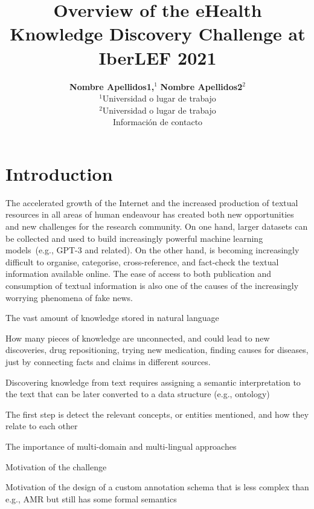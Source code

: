\documentclass[a4paper,11pt,twocolumn,twoside]{article}
\title{Overview of the eHealth Knowledge Discovery Challenge at IberLEF 2021}
\author {\textbf{Nombre Apellidos1,$^1$} \textbf{Nombre Apellidos2$^2$}\\
$^1$Universidad o lugar de trabajo\\
$^2$Universidad o lugar de trabajo\\
Información de contacto\\
}
\begin{document}


\label{firstpage} \maketitle

%

\section{Introduction}


The accelerated growth of the Internet and the increased production of textual resources in all areas of human endeavour has created both new opportunities and new challenges for the research community.
On one hand, larger datasets can be collected and used to build increasingly powerful machine learning models~(e.g., GPT-3 and related).
On the other hand, is becoming increasingly difficult to organise, categorise, cross-reference, and fact-check the textual information available online.
The ease of access to both publication and consumption of textual information is also one of the causes of the increasingly worrying phenomena of fake news.

The vast amount of knowledge stored in natural language

How many pieces of knowledge are unconnected, and could lead to new discoveries,
drug repositioning, trying new medication, finding causes for diseases, just
by connecting facts and claims in different sources.

Discovering knowledge from text requires assigning a semantic interpretation
to the text that can be later converted to a data structure (e.g., ontology)

The first step is detect the relevant concepts, or entities mentioned, and how
they relate to each other

The importance of multi-domain and multi-lingual approaches

Motivation of the challenge

Motivation of the design of a custom annotation schema that is less complex
than e.g., AMR but still has some formal semantics
\end{document}
